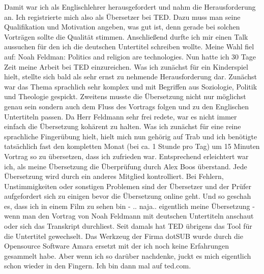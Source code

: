 Damit war ich als Englischlehrer herausgefordert und nahm die Herausforderung an. Ich registrierte mich also als Übersetzer bei TED. Dazu muss man seine Qualifikation und Motivation angeben, was gut ist, denn gerade bei solchen Vorträgen sollte die Qualität stimmen. Anschließend durfte ich mir einen Talk aussuchen für den ich die deutschen Untertitel schreiben wollte. Meine Wahl fiel auf: Noah Feldman: Politics and religion are technologies. 
Nun hatte ich 30 Tage Zeit meine Arbeit bei TED einzureichen. Was ich zunächst für ein Kinderspiel hielt, stellte sich bald als sehr ernst zu nehmende Herausforderung dar. Zunächst war das Thema sprachlich sehr komplex und mit Begriffen aus Soziologie, Politik und Theologie gespickt. Zweitens musste die Übersetzung nicht nur möglichst genau sein sondern auch dem Fluss des Vortrags folgen und zu den Englischen Untertiteln passen. Da Herr Feldmann sehr frei redete, war es nicht immer einfach die Übersetzung kohärent zu halten. Was ich zunächst für eine reine sprachliche Fingerübung hielt, hielt mich nun gehörig auf Trab und ich benötigte tatsächlich fast den kompletten Monat (bei ca. 1 Stunde pro Tag) um 15 Minuten Vortrag so zu übersetzen, dass ich zufrieden war. 
Entsprechend erleichtert war ich, als meine Übersetzung die Überprüfung durch Alex Boos überstand. Jede Übersetzung wird durch ein anderes Mitglied kontrolliert. Bei Fehlern, Unstimmigkeiten oder sonstigen Problemen sind der Übersetzer und der Prüfer aufgefordert sich zu einigen bevor die Übersetzung online geht.
Und so geschah es, dass ich in einem Film zu sehen bin - .. naja.. eigentlich meine Übersetzung - wenn man den Vortrag von Noah Feldmann mit deutschen Untertiteln anschaut oder sich das Transkript durchliest. 
Seit damals hat TED übrigens das Tool für die Untertitel gewechselt. Das Werkzeug der Firma dotSUB wurde durch die Opensource Software Amara ersetzt mit der ich noch keine Erfahrungen gesammelt habe. Aber wenn ich so darüber nachdenke, juckt es mich eigentlich schon wieder in den Fingern. Ich bin dann mal auf ted.com.
